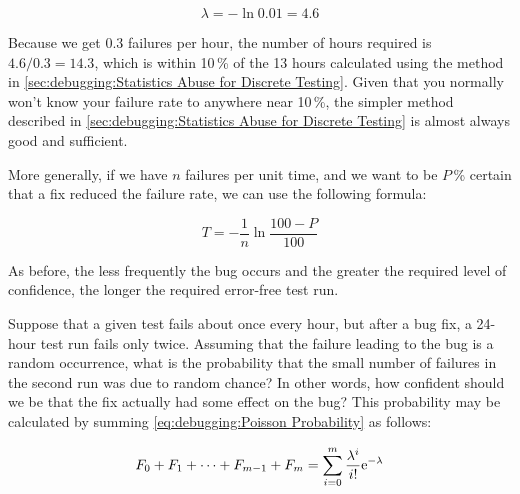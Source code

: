 \begin{equation}
	\lambda = - \ln 0.01 = 4.6
\end{equation}

Because we get $0.3$ failures per hour, the number of hours required
is $4.6/0.3 = 14.3$, which is within 10\,\% of the 13 hours
calculated using the method in
\cref{sec:debugging:Statistics Abuse for Discrete Testing}.
Given that you normally won't know your failure rate to anywhere near
10\,\%, the simpler method described in
\cref{sec:debugging:Statistics Abuse for Discrete Testing}
is almost always good and sufficient.

More generally, if we have $n$ failures per unit time, and we want to
be $P$\,\% certain that a fix reduced the failure rate, we can use the
following formula:

\begin{equation}
	T = - \frac{1}{n} \ln \frac{100 - P}{100}
\label{eq:debugging:Error-Free Test Duration}
\end{equation}

\QuickQuizEnd

As before, the less frequently the bug occurs and the greater the
required level of confidence, the longer the required error-free test run.

Suppose that a given test fails about once every hour, but after a bug
fix, a 24-hour test run fails only twice.
Assuming that the failure leading to the bug is a random occurrence,
what is the probability that the small number of
failures in the second run was due to random chance?
In other words, how confident should we be that the fix actually
had some effect on the bug?
This probability may be calculated by summing
\cref{eq:debugging:Poisson Probability} as follows:

\begin{equation}
	F_0 + F_1 + \dots + F_{m - 1} + F_m =
		\sum_{i=0}^m \frac{\lambda^i}{i!} \mathrm{e}^{-\lambda}
\end{equation}

